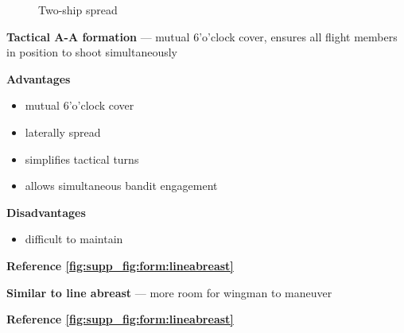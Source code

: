 \begin{figure}[htbp]
\begin{minipage}[b]{0.45\textwidth}
        \caption{Two-ship spread}
        \label{fig:supp_fig:form:spread}
    \end{minipage}
\end{figure}

\begin{tcoloritemize}
    \textbf{Tactical A-A formation} --- mutual 6'o'clock cover, ensures all flight members in position to shoot simultaneously
    \medskip

    \textbf{Advantages}
    \begin{itemize}
        \item mutual 6'o'clock cover
        \item laterally spread
        \item simplifies tactical turns
        \item allows simultaneous bandit engagement
    \end{itemize}

    \textbf{Disadvantages}
    \begin{itemize}
        \item difficult to maintain
    \end{itemize}

    \hfill\textbf{Reference \cref{fig:supp_fig:form:lineabreast}}

    \blueitem[Spread]
    \textbf{Similar to line abreast} --- more room for wingman to maneuver

    \hfill\textbf{Reference \cref{fig:supp_fig:form:lineabreast}}
\end{tcoloritemize}



\clearpage